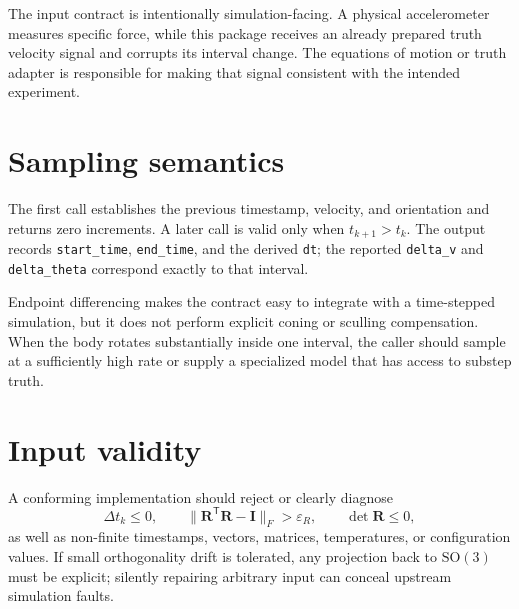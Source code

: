 \documentclass[11pt,oneside,headings=big]{scrreprt}
\newcommand{\transpose}{\mathsf{T}}
\newcommand{\mat}[1]{\bm{#1}}
\newcommand{\field}[1]{\texttt{#1}}
\begin{document}
    \begin{boundarybox}
        The input contract is intentionally simulation-facing. A physical accelerometer
        measures specific force, while this package receives an already prepared truth
        velocity signal and corrupts its interval change. The equations of motion or
        truth adapter is responsible for making that signal consistent with the intended
        experiment.
    \end{boundarybox}


    \section{Sampling semantics}
    The first  call establishes the previous timestamp, velocity,
    and orientation and returns zero increments. A later call is valid only when
    \(t_{k+1}>t_k\). The output records
    \field{start\_time}, \field{end\_time}, and the derived \field{dt}; the reported
    \field{delta\_v} and \field{delta\_theta} correspond exactly to that interval.

    Endpoint differencing makes the contract easy to integrate with a time-stepped
    simulation, but it does not perform explicit coning or sculling compensation.
    When the body rotates substantially inside one interval, the caller should sample
    at a sufficiently high rate or supply a specialized model that has access to
    substep truth.


    \section{Input validity}
    A conforming implementation should reject or clearly diagnose
    \begin{equation}
        \Delta t_k\le 0,
        \qquad
        \lVert\mat R^\transpose\mat R-\mat I\rVert_F>\varepsilon_R,
        \qquad
        \det\mat R\le 0,
    \end{equation}
    as well as non-finite timestamps, vectors, matrices, temperatures, or
    configuration values. If small orthogonality drift is tolerated, any projection
    back to \(\mathrm{SO}(3)\) must be explicit; silently repairing arbitrary input
    can conceal upstream simulation faults.
\end{document}
